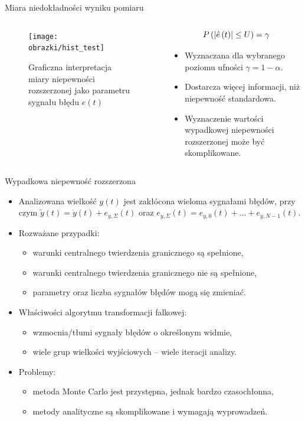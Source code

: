 \documentclass[12pt, polish, aspectratio = 169]{slides}
\begin{document}

\begin{frame}{Miara niedokładności wyniku pomiaru}
\begin{columns}
\begin{column}{0.5\textwidth}
	\begin{figure}
	\texttt{[image: obrazki/hist\_test]}
	\caption{Graficzna interpretacja miary niepewności rozszerzonej jako parametru sygnału błędu $e(t)$}
	\end{figure}
\end{column}
\begin{column}{0.5\textwidth}
	\begin{equation}
	P \left(\left|\hat{e} \left(t\right)\right| \le U\right) = \gamma \label{eq:unc_definition}
	\end{equation}
	\begin{itemize}
	\item Wyznaczana dla wybranego poziomu ufności $\gamma = 1 - \alpha$.
	\item Dostarcza więcej informacji, niż niepewność standardowa.
	\item Wyznaczenie wartości wypadkowej niepewności rozszerzonej może być skomplikowane.
	\end{itemize}
\end{column}
\end{columns}
\end{frame}

\begin{frame}{Wypadkowa niepewność rozszerzona}
\begin{itemize}
\item Analizowana wielkość $y(t)$ jest zakłócona wieloma sygnałami błędów, przy czym $\tilde{y}(t) = \dot{y}(t) + e_{y,\Sigma}(t)$ oraz $e_{y,\Sigma}(t) = e_{y,0}(t) + \hdots + e_{y,N-1}(t)$.
\item Rozważane przypadki:
	\begin{itemize}
	\item warunki centralnego twierdzenia granicznego są spełnione,
	\item warunki centralnego twierdzenia granicznego nie są spełnione,
	\item parametry oraz liczba sygnałów błędów mogą się zmieniać.
	\end{itemize}
\item Właściwości algorytmu transformacji falkowej:
	\begin{itemize}
	\item wzmocnia/tłumi sygnały błędów o określonym widmie,
	\item wiele grup wielkości wyjściowych -- wiele iteracji analizy.
	\end{itemize}
\item Problemy:
	\begin{itemize}
	\item metoda Monte Carlo jest przystępna, jednak bardzo czasochłonna,
	\item metody analityczne są skomplikowane i wymagają wyprowadzeń.
	\end{itemize}
\end{itemize}
\end{frame}
\end{document}
